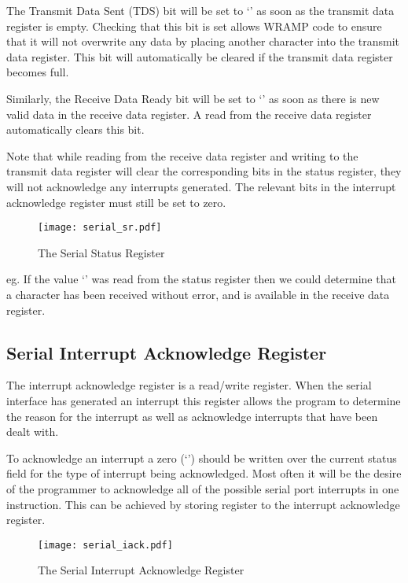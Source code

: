 The Transmit Data Sent (TDS) bit will be set to `' as soon
as the transmit data register is empty. Checking that this bit is set
allows WRAMP code to ensure that it will not overwrite any data by
placing another character into the transmit data register. This bit
will automatically be cleared if the transmit data register becomes
full.

Similarly, the Receive Data Ready bit will be set to `' as soon
as there is new valid data in the receive data register. A read from
the receive data register automatically clears this bit.

Note that while reading from the receive data register and writing to the
transmit data register will clear the corresponding bits in the status
register, they will not acknowledge any interrupts generated. The
relevant bits in the interrupt acknowledge register must still be
set to zero.

\begin{figure}[h]
\begin{center}
\texttt{[image: serial\_sr.pdf]}
\caption{The Serial Status Register}
\label{serial_sr_pic}
\end{center}
\end{figure}

\noindent
eg. If the value `' was read from the status register
then we could determine that a character has been received without
error, and is available in the receive data register.

\subsection{Serial Interrupt Acknowledge Register}

The interrupt acknowledge register is a read/write register. When the
serial interface has generated an interrupt this register allows the
program to determine the reason for the interrupt as well as
acknowledge interrupts that have been dealt with.

To acknowledge an interrupt a zero (`') should be written
over the current status field for the type of interrupt being
acknowledged. Most often it will be the desire of the programmer to
acknowledge all of the possible serial port interrupts in one
instruction. This can be achieved by storing register  to
the interrupt acknowledge register.

\begin{figure}[h]
\begin{center}
\texttt{[image: serial\_iack.pdf]}
\caption{The Serial Interrupt Acknowledge Register}
\label{serial_iack_pic}
\end{center}
\end{figure}

